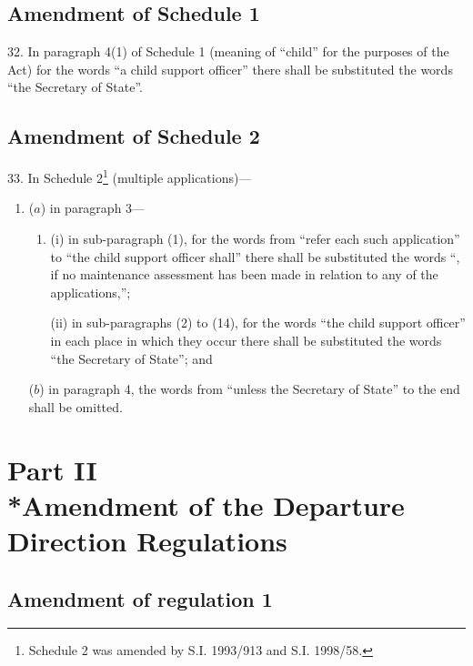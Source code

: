 \documentclass[12pt,a4paper]{article}
\begin{document}
\subsection[32. Amendment of Schedule 1]{Amendment of Schedule 1}

32.  In paragraph 4(1) of Schedule 1 (meaning of “child” for the purposes of the Act) for the words “a child support officer” there shall be substituted the words “the Secretary of State”.

\subsection[33. Amendment of Schedule 2]{Amendment of Schedule 2}

33.  In Schedule 2\footnote{\frenchspacing Schedule 2 was amended by S.I. 1993/913 and S.I. 1998/58.} (multiple applications)---
\begin{enumerate}\item[]
($a$) in paragraph 3---
\begin{enumerate}\item[]
(i) in sub-paragraph (1), for the words from “refer each such application” to “the child support officer shall” there shall be substituted the words “, if no maintenance assessment has been made in relation to any of the applications,”;

(ii) in sub-paragraphs (2) to (14), for the words “the child support officer” in each place in which they occur there shall be substituted the words “the Secretary of State”; and
\end{enumerate}

($b$) in paragraph 4, the words from “unless the Secretary of State” to the end shall be omitted.
\end{enumerate}

\section[Part II --- Amendment of the Departure Direction Regulations]{Part II\\*Amendment of the Departure Direction Regulations}

\renewcommand\parthead{--- Part II}

\subsection[34. Amendment of regulation 1]{Amendment of regulation 1}
\end{document}
